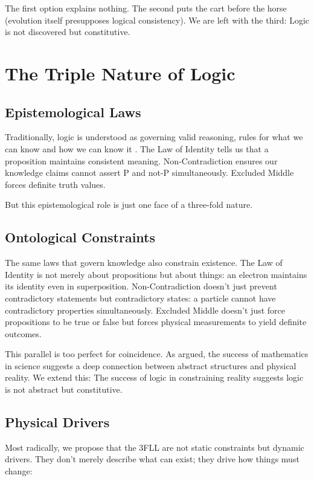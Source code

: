\documentclass[12pt,a4paper]{article}
\begin{document}
The first option explains nothing. The second puts the cart before the horse (evolution itself presupposes logical consistency). We are left with the third: Logic is not discovered but constitutive.

\section{The Triple Nature of Logic}

\subsection{Epistemological Laws}

Traditionally, logic is understood as governing valid reasoning, rules for what we can know and how we can know it \citep{frege1884foundations, russell1903principles}. The Law of Identity tells us that a proposition maintains consistent meaning. Non-Contradiction ensures our knowledge claims cannot assert P and not-P simultaneously. Excluded Middle forces definite truth values.

But this epistemological role is just one face of a three-fold nature.

\subsection{Ontological Constraints}

The same laws that govern knowledge also constrain existence. The Law of Identity is not merely about propositions but about things: an electron maintains its identity even in superposition. Non-Contradiction doesn't just prevent contradictory statements but contradictory states: a particle cannot have contradictory properties simultaneously. Excluded Middle doesn't just force propositions to be true or false but forces physical measurements to yield definite outcomes.

This parallel is too perfect for coincidence. As \citet{putnam1975mathematics} argued, the success of mathematics in science suggests a deep connection between abstract structures and physical reality. We extend this: The success of logic in constraining reality suggests logic is not abstract but constitutive.

\subsection{Physical Drivers}

Most radically, we propose that the 3FLL are not static constraints but dynamic drivers. They don't merely describe what can exist; they drive how things must change:
\end{document}
